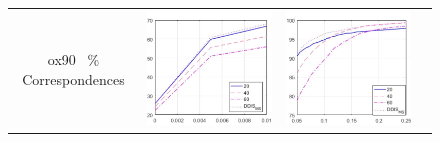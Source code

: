 \documentclass[10pt,twocolumn,letterpaper]{article}
\begin{document}
{\begin{figure}[htb]
\begin{tabular}{cccc}
ox{90}{    \, \% Correspondences} &
		\includegraphics[scale=0.5]{figures/PieceSizeLow.png} &  
		\includegraphics[scale=0.5]{figures/PieceSizeMedium.png}&

\end{tabular}
\end{figure}}
\end{document}
